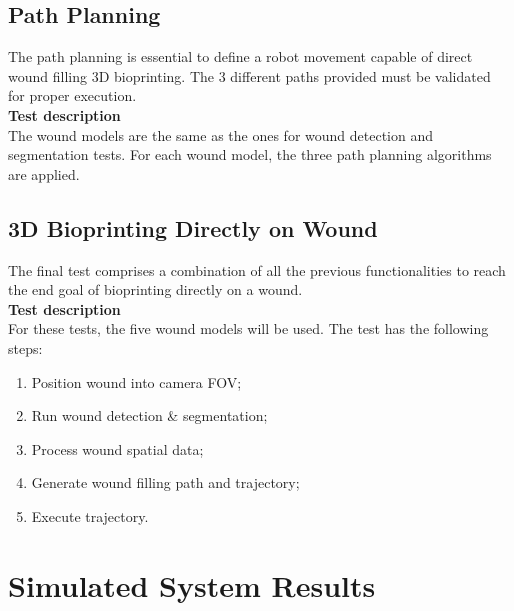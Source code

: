 \subsection{Path Planning}
\label{subsec:system_validation_tests_setup_path_planning}

The path planning is essential to define a robot movement capable of direct wound filling 3D bioprinting. The 3 different paths provided must be validated for proper execution.\\

\textbf{Test description}\\
The wound models are the same as the ones for wound detection and segmentation tests. For each wound model, the three path planning algorithms are applied.


\subsection{3D Bioprinting Directly on Wound}
\label{subsec:system_validation_tests_setup_bioprinting_directly_wound}

The final test comprises a combination of all the previous functionalities to reach the end goal of bioprinting directly on a wound.\\

\textbf{Test description}\\
For these tests, the five wound models will be used. The test has the following steps:

\begin{enumerate}
    \item Position wound into camera FOV;
    \item Run wound detection \& segmentation;
    \item Process wound spatial data;
    \item Generate wound filling path and trajectory;
    \item Execute trajectory.
\end{enumerate}




\section{Simulated System Results}
\label{sec:system_validation_simulation_results}


